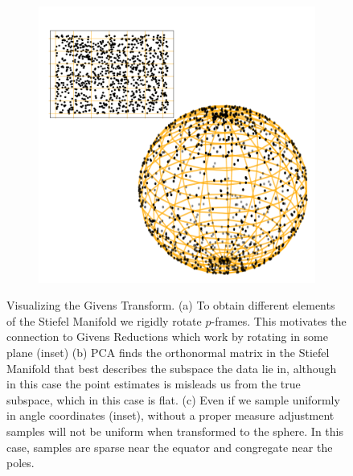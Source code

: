 \documentclass{article}
\begin{document}
\begin{figure}
\begin{subfigure}[b]{0.25\textwidth}
        \caption{}
        \label{fig:MleSubspaceEstimate}
    \end{subfigure}
    ~ %
    \begin{subfigure}[b]{0.26\textwidth}
        \includegraphics[width=\textwidth]{AreaForm.pdf}
        \caption{}
        \label{fig:AreaForm}
    \end{subfigure}
    \caption{Visualizing the Givens Transform. (a) To obtain different elements of the Stiefel Manifold we rigidly rotate $p$-frames. This motivates the connection to Givens Reductions which work by rotating in some plane (inset) (b) PCA finds the orthonormal matrix in the Stiefel Manifold that best describes the subspace the data lie in, although in this case the point estimates is misleads us from the true subspace, which in this case is flat. (c) Even if we sample uniformly in angle coordinates (inset), without a proper measure adjustment samples will not be uniform when transformed to the sphere. In this case, samples are sparse near the equator and congregate near the poles.}\label{fig:Givens}
\end{figure}
 
\end{document}
